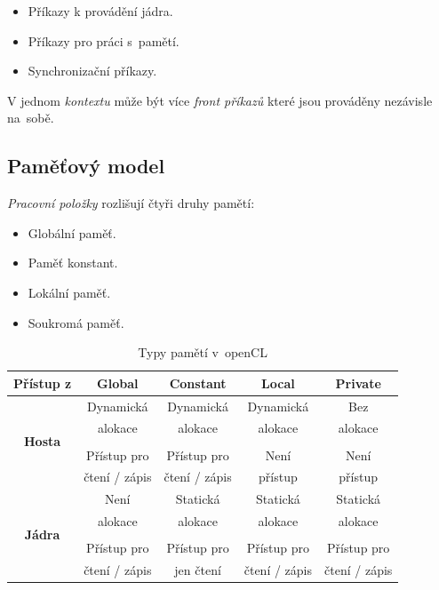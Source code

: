 \begin{itemize}
\item Příkazy k provádění jádra.
\item Příkazy pro práci s~pamětí.
\item Synchronizační příkazy.
\end{itemize}


V jednom \emph{kontextu} může být více \emph{front příkazů} které jsou prováděny nezávisle na~sobě.


\subsection{Paměťový model}

\emph{Pracovní položky} rozlišují čtyři druhy pamětí:

\begin{itemize}
\item Globální paměť.
\item Paměť konstant.
\item Lokální paměť.
\item Soukromá paměť.
\end{itemize}


\begin{table}[htbp]
\centering
 
\begin{tabular}{|c||c|c|c|c|}
\hline
Přístup z& \bfseries Global & \bfseries Constant & \bfseries Local & \bfseries Private \\
\hline
\hline
\multirow{5}{*}{\bfseries Hosta}  & Dynamická & Dynamická & Dynamická & Bez\\
& alokace & alokace & alokace & alokace\\
& & & &\\
& Přístup pro & Přístup pro & Není & Není\\
& čtení / zápis & čtení / zápis & přístup & přístup\\
\hline
\multirow{5}{*}{\bfseries Jádra}  & Není & Statická & Statická & Statická\\
& alokace & alokace & alokace & alokace\\
& & & &\\
& Přístup pro & Přístup pro & Přístup pro & Přístup pro\\
& čtení / zápis & jen čtení & čtení / zápis & čtení / zápis\\
\hline
\end{tabular}
\caption{Typy pamětí v~openCL}
\label{tab:typypameti} 
\end{table}

